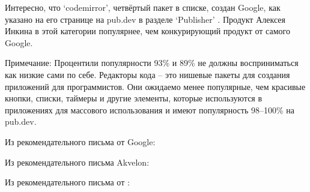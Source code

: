 Интересно, что `codemirror', четвёртый пакет в списке, создан Google,
как указано на его странице на pub.dev в разделе `Publisher' .
Продукт Алексея Инкина в этой категории популярнее, чем конкурирующий продукт от самого Google.

Примечание: Процентили популярности 93\% и 89\% не должны восприниматься как низкие сами по себе.
Редакторы кода -- это нишевые пакеты для создания приложений для программистов.
Они ожидаемо менее популярные, чем красивые кнопки, списки, таймеры и другие элементы,
которые используются в приложениях для массового использования и имеют популярность 98--100\% на pub.dev.



Из рекомендательного письма от Google:


Из рекомендательного письма Akvelon:


Из рекомендательного письма от \MrEditorT:

